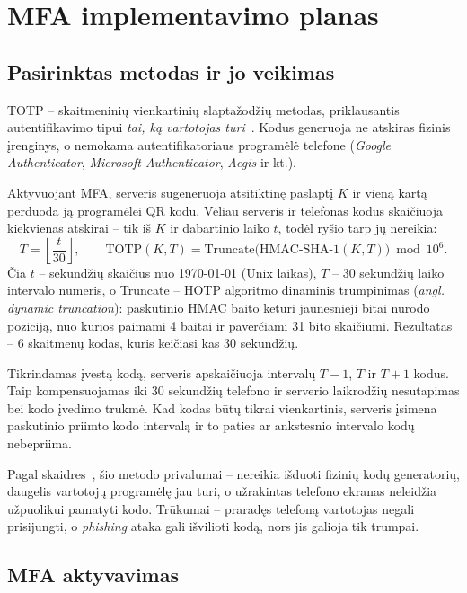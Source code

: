 \section{MFA implementavimo planas}
\label{sec:planas}

\subsection{Pasirinktas metodas ir jo veikimas}
\label{subsec:metodas}

TOTP -- skaitmeninių vienkartinių slaptažodžių metodas, priklausantis autentifikavimo tipui \emph{tai, ką vartotojas turi}~\cite{VMA}. Kodus generuoja ne atskiras fizinis įrenginys, o nemokama autentifikatoriaus programėlė telefone (\textit{Google Authenticator}, \textit{Microsoft Authenticator}, \textit{Aegis} ir kt.).

Aktyvuojant MFA, serveris sugeneruoja atsitiktinę paslaptį $K$ ir vieną kartą perduoda ją programėlei QR kodu. Vėliau serveris ir telefonas kodus skaičiuoja kiekvienas atskirai -- tik iš $K$ ir dabartinio laiko $t$, todėl ryšio tarp jų nereikia:
\begin{equation}
    T = \left\lfloor \frac{t}{30} \right\rfloor, \qquad
    \text{TOTP}(K, T) = \text{Truncate}\bigl(\text{HMAC-SHA-1}(K, T)\bigr) \bmod 10^{6}.
\end{equation}
Čia $t$ -- sekundžių skaičius nuo 1970-01-01 (Unix laikas), $T$ -- 30 sekundžių laiko intervalo numeris, o Truncate -- HOTP algoritmo dinaminis trumpinimas (\textit{angl. dynamic truncation}): paskutinio HMAC baito keturi jaunesnieji bitai nurodo poziciją, nuo kurios paimami 4 baitai ir paverčiami 31 bito skaičiumi. Rezultatas -- 6 skaitmenų kodas, kuris keičiasi kas 30 sekundžių.

Tikrindamas įvestą kodą, serveris apskaičiuoja intervalų $T-1$, $T$ ir $T+1$ kodus. Taip kompensuojamas iki 30 sekundžių telefono ir serverio laikrodžių nesutapimas bei kodo įvedimo trukmė. Kad kodas būtų tikrai vienkartinis, serveris įsimena paskutinio priimto kodo intervalą ir to paties ar ankstesnio intervalo kodų nebepriima.

Pagal skaidres~\cite{VMA}, šio metodo privalumai -- nereikia išduoti fizinių kodų generatorių, daugelis vartotojų programėlę jau turi, o užrakintas telefono ekranas neleidžia užpuolikui pamatyti kodo. Trūkumai -- praradęs telefoną vartotojas negali prisijungti, o \textit{phishing} ataka gali išvilioti kodą, nors jis galioja tik trumpai.

\subsection{MFA aktyvavimas}
\label{subsec:aktyvavimas}

